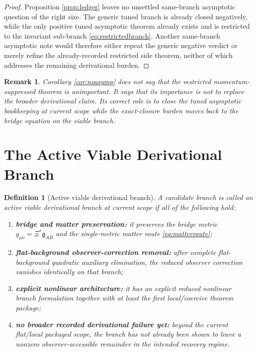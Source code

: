\documentclass[11pt]{article}
\newcommand{\BridgeMetric}{\mathfrak{g}}
\newtheorem{definition}{Definition}
\newtheorem{remark}{Remark}
\begin{document}
\begin{proof}
Proposition \ref{prop:ledger} leaves no unsettled same-branch asymptotic question of the right size. The generic tuned branch is already closed negatively, while the only positive tuned asymptotic theorem already exists and is restricted to the invariant sub-branch \eqref{eq:restrictedbranch}. Another same-branch asymptotic note would therefore either repeat the generic negative verdict or merely refine the already-recorded restricted side theorem, neither of which addresses the remaining derivational burden.
\end{proof}

\begin{remark}
Corollary \ref{cor:noasymp} does not say that the restricted momentum-suppressed theorem is unimportant. It says that its importance is not to replace the broader derivational claim. Its correct role is to close the tuned asymptotic bookkeeping at current scope while the exact-closure burden moves back to the bridge equation on the viable branch.
\end{remark}

\section{The Active Viable Derivational Branch}

\begin{definition}[Active viable derivational branch]
\label{def:viable}
A candidate branch is called an \emph{active viable derivational branch} at current scope if all of the following hold:
\begin{enumerate}
    \item \textbf{bridge and matter preservation:} it preserves the bridge metric \(g_{\mu\nu}=\Xi^\ast\BridgeMetric_{AB}\) and the single-metric matter route \eqref{eq:matterroute};
    \item \textbf{flat-background observer-correction removal:} after complete flat-background quadratic auxiliary elimination, the reduced observer correction vanishes identically on that branch;
    \item \textbf{explicit nonlinear architecture:} it has an explicit reduced nonlinear branch formulation together with at least the first local/coercive theorem package;
    \item \textbf{no broader recorded derivational failure yet:} beyond the current flat/local packaged scope, the branch has not already been shown to leave a nonzero observer-accessible remainder in the intended recovery regime.
\end{enumerate}
\end{definition}
\end{document}
